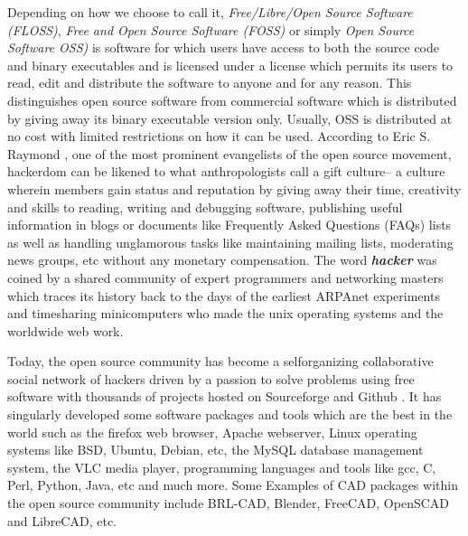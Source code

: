 \hspace{30} Depending   on   how   we   choose   to   call   it, \textit{Free/Libre/Open   Source  
Software   (FLOSS)},   \textit{Free   and   Open   Source   Software   (FOSS)}   or   simply   \textit{Open  
Source   Software   OSS)}   is   software   for   which   users   have   access   to   both   the  
source   code   and   binary   executables   and   is   licensed   under   a   license   which  
permits   its   users   to   read,   edit   and   distribute   the   software   to   anyone   and   for   any  
reason.   This   distinguishes   open   source   software   from   commercial   software  
which   is   distributed   by   giving   away   its   binary   executable   version   only.   Usually,  
OSS   is   distributed   at   no   cost   with   limited   restrictions   on   how   it   can   be   used.  
According   to   Eric   S.   Raymond \cite{33},   one   of   the   most   prominent   evangelists   of  
the   open   source   movement,   hackerdom   can   be   likened   to   what   anthropologists  
call   a   gift   culture–   a   culture   wherein   members   gain   status   and   reputation   by  
giving   away   their   time,   creativity   and   skills   to   reading,   writing   and   debugging  
software,   publishing   useful   information   in   blogs   or   documents   like   Frequently  
Asked   Questions   (FAQs)   lists   as   well   as   handling   unglamorous   tasks   like  
maintaining   mailing   lists,   moderating   news   groups,   etc   without   any   monetary  
compensation.   The   word   \textit{\textbf{hacker}}   was   coined   by   a   shared   community   of   expert  
programmers   and   networking   masters   which   traces   its   history   back   to   the   days  
of   the   earliest   ARPAnet   experiments   and   time­sharing   minicomputers   who  
made   the   unix   operating   systems   and   the   world­wide   web   work.   

\hspace{30} Today,   the   open   source   community   has   become   a   self­organizing  
collaborative   social   network   of   hackers   driven   by   a   passion   to   solve   problems  
using   free   software   with   thousands   of   projects   hosted   on   Sourceforge \cite{34}   and  
Github \cite{35}.   It   has   singularly   developed   some   software   packages   and   tools  
which   are   the   best   in   the   world   such   as   the   firefox   web   browser,   Apache  
web­server,   Linux   operating   systems   like   BSD,   Ubuntu,   Debian, etc,   the   MySQL  
database   management   system,   the   VLC   media   player,   programming  languages   and   tools   like   gcc,   C,   Perl,   Python,   Java,   etc   and   much   more.   Some  Examples   of   CAD   packages   within   the   open   source  community   include   BRL-­CAD,   Blender,   FreeCAD,   OpenSCAD   and   LibreCAD,  
etc.

